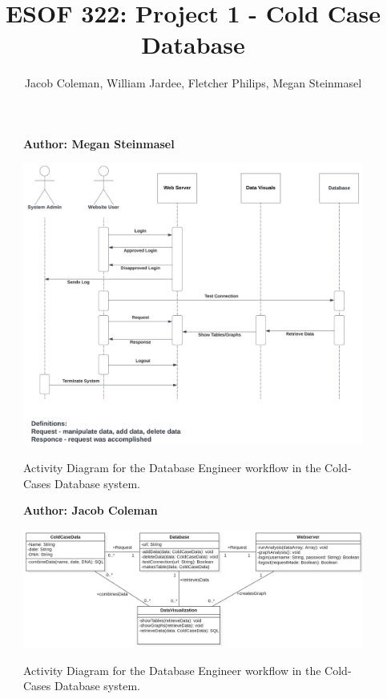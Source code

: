 \documentclass[11pt]{article}
\begin{document}
\title{ESOF 322: Project 1 - Cold Case Database}
\author{Jacob Coleman, William Jardee, Fletcher Philips, Megan Steinmasel}
\maketitle


\begin{figure}[!ht]
\centering
\textbf{Author: Megan Steinmasel}
\vspace{1em}

	\includegraphics[width=.85\textwidth]{./project2-Diagrams/ccsequence.png}\\
	\caption{Activity Diagram for the Database Engineer workflow in the Cold-Cases Database system.}
	\label{fig:ccSequence}
\end{figure}

\begin{figure}[!ht]
\centering
\textbf{Author: Jacob Coleman}
\vspace{1em}

	\includegraphics[width=.95\textwidth]{./project2-Diagrams/project2ClassDiagram.png}\\
	\caption{Activity Diagram for the Database Engineer workflow in the Cold-Cases Database system.}
	\label{fig:classDiagram}
\end{figure}
\end{document}
